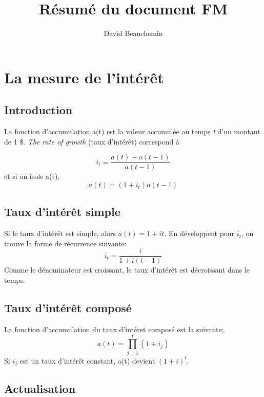 \documentclass[11pt,french]{report}
\title{Résumé du document FM}
\author{David Beauchemin}
\begin{document}
\maketitle

\tableofcontents

\chapter{La mesure de l'intérêt}
\label{chap:mesure intérêt}

\section{Introduction}
\label{sec:introduction}

La fonction d'accumulation a(t) est la valeur accumulée au temps \emph{t} d'un montant de 1 \$.
\emph{The rate of growth} (taux d'intérêt) correspond à 

\begin{equation*}
i_t = \frac{a(t) - a(t-1)}{a(t - 1)}
\end{equation*}
et si on isole a(t),
\begin{equation}
a(t) = (1 + i_t)a(t-1)
\end{equation}

\section{Taux d'intérêt simple}
\label{sec:intérêt simple}

Si le taux d'intérêt est simple, alors $a(t) = 1 + it$. En développent pour $i_{t}$, on trouve la forme de récurrence suivante: 
\begin{equation}
i_t = \frac{i}{1 + i(t - 1)}
\end{equation}
Comme le dénominateur est croissant, le taux d'intérêt est décroissant dans le temps.

\section{Taux d'intérêt composé}
\label{sec:intérêt composé}

La fonction d'accumulation du taux d'intéret composé est la suivante;
\begin{equation}
a(t) = \prod_{j=1}^{t} (1 + i_j)
\end{equation}
Si $i_j$ est un taux d'intérêt constant, a(t) devient $ (1 + i)^{t} $.

\section{Actualisation}
\label{sec:actualisation}
\end{document}
